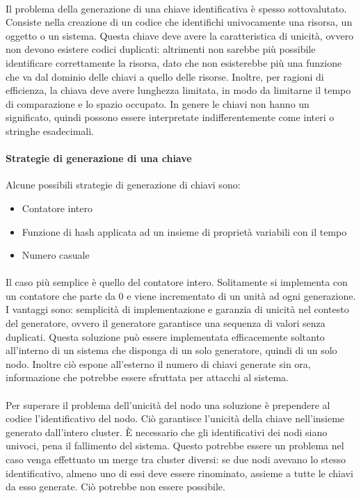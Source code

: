 \documentclass{article}
\begin{document}
\paragraph{} Il problema della generazione di una chiave identificativa è spesso sottovalutato. Consiste nella creazione di un codice che identifichi univocamente una risorsa, un oggetto o un sistema. Questa chiave deve avere la caratteristica di unicità, ovvero non devono esistere codici duplicati: altrimenti non sarebbe più possibile identificare correttamente la risorsa, dato che non esisterebbe più una funzione che va dal dominio delle chiavi a quello delle risorse. Inoltre, per ragioni di efficienza, la chiava deve avere lunghezza limitata, in modo da limitarne il tempo di comparazione e lo spazio occupato. In genere le chiavi non hanno un significato, quindi possono essere interpretate indifferentemente come interi o stringhe esadecimali.  

\paragraph{Strategie di generazione di una chiave} Alcune possibili strategie di generazione di chiavi sono: \begin{itemize}
	\item Contatore intero
	\item Funzione di hash applicata ad un insieme di proprietà variabili con il tempo
	\item Numero casuale
\end{itemize}

\paragraph{} Il caso più semplice è quello del contatore intero. Solitamente si implementa con un contatore che parte da 0 e viene incrementato di un unità ad ogni generazione. I vantaggi sono: semplicità di implementazione e garanzia di unicità nel contesto del generatore, ovvero il generatore garantisce una sequenza di valori senza duplicati. Questa soluzione può essere implementata efficacemente soltanto all'interno di un sistema che disponga di un solo generatore, quindi di un solo nodo. Inoltre ciò espone all'esterno il numero di chiavi generate sin ora, informazione che potrebbe essere sfruttata per attacchi al sistema. 

\paragraph{} Per superare il problema dell'unicità del nodo una soluzione è prependere al codice l'identificativo del nodo. Ciò garantisce l'unicità della chiave nell'insieme generato dall'intero cluster. È necessario che gli identificativi dei nodi siano univoci, pena il fallimento del sistema. Questo potrebbe essere un problema nel caso venga effettuato un merge tra cluster diversi: se due nodi avevano lo stesso identificativo, almeno uno di essi deve essere rinominato, assieme a tutte le chiavi da esso generate. Ciò potrebbe non essere possibile.  
\end{document}
